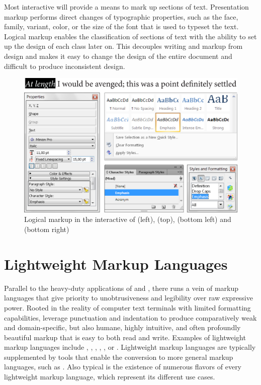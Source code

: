 Most interactive  will provide a means to mark up sections of text.
Presentation markup performs direct changes of typographic properties, such as
the face, family, variant, color, or the size of the font that is used to
typeset the text. Logical markup enables the classification of sections of text
with the ability to set up the design of each class later on. This decouples
writing and markup from design and makes it easy to change the design of the
entire document and difficult to produce inconsistent design.

\begin{figure}
  \includegraphics[width=\textwidth]{examples/02/interactive-editors.png}
  \caption{Logical markup in the interactive  of 
    (left),  (top),  (bottom left) and
     (bottom right)}
\end{figure}

\section{Lightweight Markup Languages}
Parallel to the heavy-duty applications of  and ,
there runs a vein of markup languages that give priority to unobtrusiveness and
legibility over raw expressive power. Rooted in the reality of computer text
terminals with limited formatting capabilities,  leverage punctuation and indentation to produce comparatively weak and
domain-specific, but also humane, highly intuitive, and often profoundly
beautiful markup that is easy to both read and write. Examples of lightweight
markup languages include , , ,
, , or .  Lightweight markup languages
are typically supplemented by tools that enable the conversion to more general
markup languages, such as . Also typical is the existence of
numerous flavors of every lightweight markup language, which represent its
different use cases.
